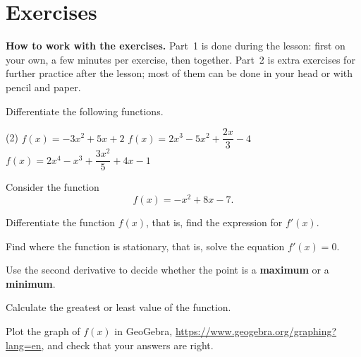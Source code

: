 
\section{Exercises}
\label{c12:sec:uppgifter}

\begin{aside}
\textbf{How to work with the exercises.} Part~1 is done during the lesson: first on your own, a
few minutes per exercise, then together. Part~2 is extra exercises for further practice after
the lesson; most of them can be done in your head or with pencil and paper.

\end{aside}


Differentiate the following functions.
\begin{delar}(2)
  \task $f(x) = -3x^2 + 5x + 2$
  \task $f(x) = 2x^3 - 5x^2 + \dfrac{2x}{3} - 4$
  \task* $f(x) = 2x^4 - x^3 + \dfrac{3x^2}{5} + 4x - 1$
\end{delar}

Consider the function
\[
  f(x) = -x^2 + 8x - 7.
\]
\begin{parts}
  \item Differentiate the function $f(x)$, that is, find the expression for $f'(x)$.
  \item Find where the function is stationary, that is, solve the equation $f'(x) = 0$.
  \item Use the second derivative to decide whether the point is a \textbf{maximum} or a
    \textbf{minimum}.
  \item Calculate the greatest or least value of the function.
  \item Plot the graph of $f(x)$ in GeoGebra, \url{https://www.geogebra.org/graphing?lang=en}, and
    check that your answers are right.
\end{parts}

